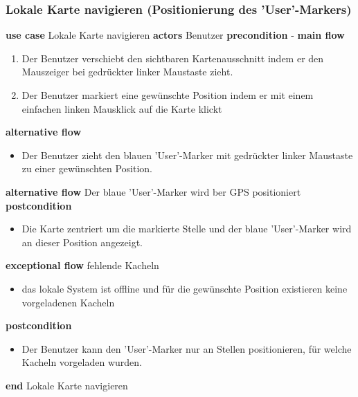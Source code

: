 \subsubsection{Lokale Karte navigieren (Positionierung des 'User'-Markers)}\label{subsubsec:uc_locmapnav}
\noindent \textbf{use case} Lokale Karte navigieren \newline
\indent \textbf{actors} \newline
\indent \indent Benutzer \newline
\indent \textbf{precondition} \newline
\indent \indent - \newline
\indent \textbf{main flow}
\begin{enumerate}[labelwidth=0pt,leftmargin=39pt,noitemsep,topsep=0pt,parsep=0pt,partopsep=0pt]
\item Der Benutzer verschiebt den sichtbaren Kartenausschnitt indem er den Mauszeiger bei gedrückter linker Maustaste zieht.
\item Der Benutzer markiert eine gewünschte Position indem er mit einem einfachen linken Mausklick auf die Karte klickt
\end{enumerate}
\indent \indent \textbf{alternative flow}
\begin{itemize}[label={},labelwidth=0pt,leftmargin=24pt,noitemsep,topsep=0pt,parsep=0pt,partopsep=0pt]
\item Der Benutzer zieht den blauen 'User'-Marker mit gedrückter linker Maustaste zu einer gewünschten Position.
\end{itemize}
\indent \indent \textbf{alternative flow} \newline
\indent \indent Der blaue 'User'-Marker wird ber GPS positioniert \newline
\indent \textbf{postcondition}
\begin{itemize}[label={},labelwidth=0pt,leftmargin=24pt,noitemsep,topsep=0pt,parsep=0pt,partopsep=0pt]
\item Die Karte zentriert um die markierte Stelle und der blaue 'User'-Marker wird an dieser Position angezeigt.
\end{itemize}
\indent \indent \textbf{exceptional flow} fehlende Kacheln
\begin{itemize}[label={},labelwidth=0pt,leftmargin=24pt,noitemsep,topsep=0pt,parsep=0pt,partopsep=0pt]
\item das lokale System ist offline und für die gewünschte Position existieren keine vorgeladenen Kacheln
\end{itemize}
\indent \indent \textbf{postcondition}
\begin{itemize}[label={},labelwidth=0pt,leftmargin=24pt,noitemsep,topsep=0pt,parsep=0pt,partopsep=0pt]
\item Der Benutzer kann den 'User'-Marker nur an Stellen positionieren, für welche Kacheln vorgeladen wurden.
\end{itemize}
\noindent \textbf{end} Lokale Karte navigieren \newline

